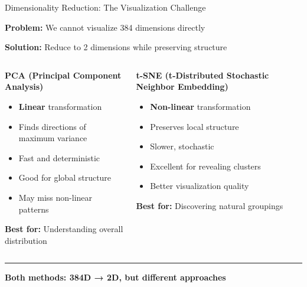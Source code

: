 \documentclass[8pt,aspectratio=169]{beamer}
\newcommand{\bottomnote}[1]{%
\vfill
\vspace{-2mm}
\textcolor{mllavender2}{\rule{\textwidth}{0.4pt}}
\vspace{1mm}
\footnotesize
\textbf{#1}
}
\begin{document}
\begin{frame}[t]{Dimensionality Reduction: The Visualization Challenge}

\textbf{Problem:} We cannot visualize 384 dimensions directly

\vspace{0.5cm}

\textbf{Solution:} Reduce to 2 dimensions while preserving structure

\vspace{0.5cm}

\begin{columns}[t]
\begin{column}{0.48\textwidth}
\textbf{PCA (Principal Component Analysis)}

\begin{itemize}
    \item \textbf{Linear} transformation
    \item Finds directions of maximum variance
    \item Fast and deterministic
    \item Good for global structure
    \item May miss non-linear patterns
\end{itemize}

\vspace{0.3cm}

\textbf{Best for:} Understanding overall distribution
\end{column}

\begin{column}{0.48\textwidth}
\textbf{t-SNE (t-Distributed Stochastic Neighbor Embedding)}

\begin{itemize}
    \item \textbf{Non-linear} transformation
    \item Preserves local structure
    \item Slower, stochastic
    \item Excellent for revealing clusters
    \item Better visualization quality
\end{itemize}

\vspace{0.3cm}

\textbf{Best for:} Discovering natural groupings
\end{column}
\end{columns}

\bottomnote{Both methods: 384D → 2D, but different approaches}
\end{frame}
\end{document}
